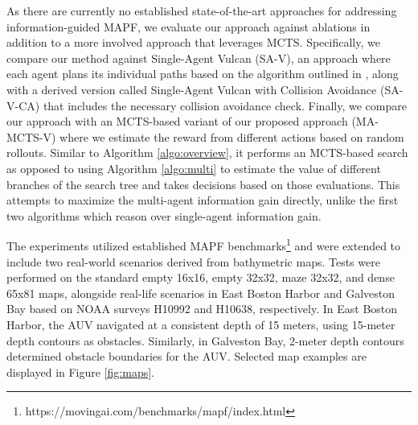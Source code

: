 \documentclass[letterpaper, 10 pt, conference]{IEEEConference}
\begin{document}
As there are currently no established state-of-the-art approaches for addressing information-guided MAPF, we evaluate our approach against ablations in addition to a more involved approach that leverages MCTS. Specifically, we compare our method against Single-Agent Vulcan (SA-V), an approach where each agent plans its individual paths based on the algorithm outlined in \cite{ayton2017}, along with a derived version called Single-Agent Vulcan with Collision Avoidance (SA-V-CA) that includes the necessary collision avoidance check. Finally, we compare our approach with an MCTS-based variant of our proposed approach (MA-MCTS-V) where we estimate the reward from different actions based on random rollouts. Similar to Algorithm \ref{algo:overview}, it performs an MCTS-based search as opposed to using Algorithm \ref{algo:multi} to estimate the value of different branches of the search tree and takes decisions based on those evaluations. This attempts to maximize the multi-agent information gain directly, unlike the first two algorithms which reason over single-agent information gain.

The experiments utilized established MAPF benchmarks\footnote{https://movingai.com/benchmarks/mapf/index.html} \cite{mapf_benchmarks} and were extended to include two real-world scenarios derived from bathymetric maps. Tests were performed on the standard empty 16x16, empty 32x32, maze 32x32, and dense 65x81 maps, alongside real-life scenarios in East Boston Harbor and Galveston Bay based on NOAA surveys H10992 and H10638, respectively. In East Boston Harbor, the AUV navigated at a consistent depth of 15 meters, using 15-meter depth contours as obstacles. Similarly, in Galveston Bay, 2-meter depth contours determined obstacle boundaries for the AUV. Selected map examples are displayed in Figure \ref{fig:maps}.
\end{document}
